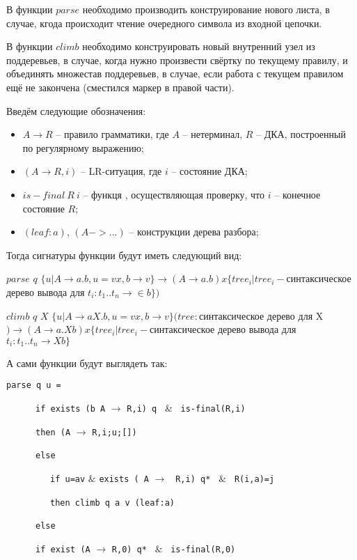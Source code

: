 В функции $parse$ необходимо производить конструирование нового листа, в случае, кгода происходит чтение очередного символа из входной цепочки.

В функции $climb$ необходимо конструировать новый внутренний узел из поддеревьев, в случае, когда нужно произвести свёртку по текущему правилу, и объединять множестав поддеревьев, в случае, если работа с текущем правилом ещё не закончена (сместился маркер в правой части).

Введём следующие обозначения:
\begin{itemize}
  \item $A \rightarrow R$ -- правило грамматики, где $A$ -- нетерминал, $R$ -- ДКА, построенный по регулярному выражению; 
  \item $(A \rightarrow R,i)$ -- LR-ситуация, где $i$ -- состояние ДКА;
  \item $is-final \ R \ i$ -- функця , осуществляющая проверку, что $i$ -- конечное состояние $R$;
  \item $(leaf:a)$, $(A->...)$ -- конструкции дерева разбора;
\end{itemize}

Тогда сигнатуры функции будут иметь следующий вид:

$parse$ $ q $ $ \{ u | A \rightarrow a.b, u = vx, b \rightarrow v \} \rightarrow (A \rightarrow a.b) x \{tree_i | tree_i  - $синтаксическое дерево вывода для $ t_i : t_1 .. t_n  \rightarrow \in b \})$

$climb$ $q$ $X$ $\{ u | A \rightarrow aX.b, u = vx, b \rightarrow v \} (tree: $синтаксическое дерево для X$) \rightarrow (A \rightarrow a.Xb) x \{tree_i | tree_i  - $синтаксическое дерево вывода для $ t_i : t_1 .. t_n  \rightarrow  Xb\}$

А сами функции будут выглядеть так:

\verb|parse q u =|

\ \ \ \ \ \  \verb|if exists (b A| $\rightarrow$ \verb|R,i) q| \ $\&$ \ \verb|is-final(R,i)| 
  
\ \ \ \ \ \  \verb|then (A| $\rightarrow$ \verb|R,i;u;[])|

\ \ \ \ \ \  \verb|else|

\ \ \ \ \ \ \ \ \ \verb|if u=av| $\&$ \verb|exists ( A| $\rightarrow$ \verb| R,i) q* | $\&$ \verb| R(i,a)=j| 
     
\ \ \ \ \ \ \ \ \ \verb|then climb q a v (leaf:a)|
     
\ \ \ \ \ \  \verb|else|
     
\ \ \ \ \ \  \verb|if exist (A| $\rightarrow$ \verb|R,0) q*| \ $\&$ \ \verb|is-final(R,0)| 
        
